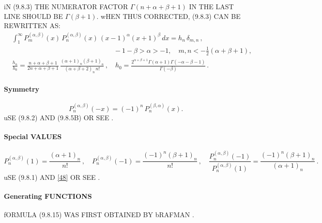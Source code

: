 \documentclass[twoside,11pt]{article}
\newcommand\al\alpha
\newcommand\be\beta
\newcommand\de\delta
\newcommand\Ga{\Gamma}
\newcommand\thalf{\tfrac12}
\newcommand\iy\infty
\begin{document}
iN (9.8.3) THE NUMERATOR FACTOR $\Ga(n+\al+\be+1)$ IN THE LAST LINE SHOULD BE 
$\Ga(\be+1)$. wHEN THUS CORRECTED, (9.8.3) CAN BE REWRITTEN AS: 
\begin{equation} 
\begin{split} 
&\int_1^\iy P_m^{(\al,\be)}(x)\,P_n^{(\al,\be)}(x)\,(x-1)^\al (x+1)^\be\,dx=h_n\,\de_{m,n}\,,\\ 
&\qquad\qquad\qquad\qquad\qquad\qquad\qquad\quad-1-\be>\al>-1,\quad m,n<-\thalf(\al+\be+1),\\ 
&\frac{h_n}{h_0}= 
\frac{n+\al+\be+1}{2n+\al+\be+1}\, 
\frac{(\al+1)_n(\be+1)_n}{(\al+\be+2)_n\,n!}\,,\quad 
h_0=\frac{2^{\al+\be+1}\Ga(\al+1)\Ga(-\al-\be-1)}{\Ga(-\be)}\,. 
\end{split} 
\label{122} 
\end{equation} 
 
% 
\paragraph{Symmetry} 
\begin{equation} 
P_n^{(\al,\be)}(-x)=(-1)^n\,P_n^{(\be,\al)}(x). 
\label{48} 
\end{equation} 
uSE (9.8.2) AND (9.8.5B) OR SEE . 
% 
\paragraph{Special VALUES} 
\begin{equation} 
P_n^{(\al,\be)}(1)=\frac{(\al+1)_n}{n!}\,,\quad 
P_n^{(\al,\be)}(-1)=\frac{(-1)^n(\be+1)_n}{n!}\,,\quad 
\frac{P_n^{(\al,\be)}(-1)}{P_n^{(\al,\be)}(1)}=\frac{(-1)^n(\be+1)_n}{(\al+1)_n}\,. 
\label{50} 
\end{equation} 
uSE (9.8.1) AND \eqref{48} OR SEE . 
% 
\paragraph{Generating FUNCTIONS} 
fORMULA (9.8.15) WAS FIRST OBTAINED BY bRAFMAN . 
% 
\end{document}
